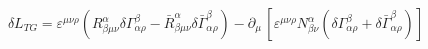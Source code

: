 \begin{equation}
\delta L_{TG}=\varepsilon^{\mu \nu\rho}(R_{\beta\mu \nu}^{\alpha
}\delta \Gamma _{\alpha\rho}^{\beta}-\bar{R}_{\beta\mu\nu
}^{\alpha }\delta\bar{\Gamma}_{\alpha \rho }^{\beta})-\partial
_{\mu}\,[\varepsilon^{\mu\nu\rho}N_{\beta\nu}^{\alpha}(\delta
\Gamma_{\alpha\rho}^{\beta}+\delta\bar{\Gamma}_{\alpha\rho
}^{\beta})]  \label{eqn:28}
\end{equation}

